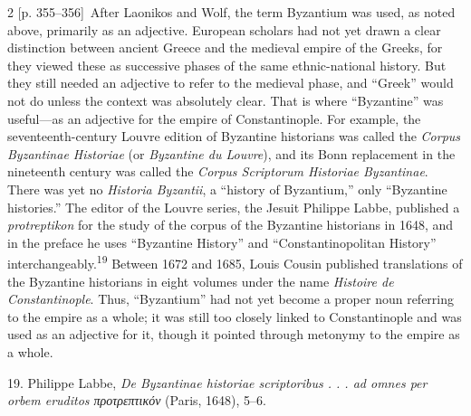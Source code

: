 \documentclass[10pt,a4paper]{article}
\begin{document}
\begin{paracol}{2}
\switchcolumn
{\scriptsize\color{gray}[p. 355–356]}\ After Laonikos and Wolf, the term Byzantium was used, as noted above, primarily as an adjective. European scholars had not yet drawn a clear distinction between ancient Greece and the medieval empire of the Greeks, for they viewed these as successive phases of the same ethnic-national history. But they still needed an adjective to refer to the medieval phase, and “Greek” would not do unless the context was absolutely clear. That is where “Byzantine” was useful—as an adjective for the empire of Constantinople. For example, the seventeenth-century Louvre edition of Byzantine historians was called the \textit{Corpus Byzantinae Historiae} (or \textit{Byzantine du Louvre}), and its Bonn replacement in the nineteenth century was called the \textit{Corpus Scriptorum Historiae Byzantinae}. There was yet no \textit{Historia Byzantii}, a “history of Byzantium,” only “Byzantine histories.” The editor of the Louvre series, the Jesuit Philippe Labbe, published a \textit{protreptikon} for the study of the corpus of the Byzantine historians in 1648, and in the preface he uses “Byzantine History” and “Constantinopolitan History” interchangeably.\nobreak\textsuperscript{19} Between 1672 and 1685, Louis Cousin published translations of the Byzantine historians in eight volumes under the name \textit{Histoire de Constantinople}. Thus, “Byzantium” had not yet become a proper noun referring to the empire as a whole; it was still too closely linked to Constantinople and was used as an adjective for it, though it pointed through metonymy to the empire as a whole.\par{\small 19. Philippe Labbe, \textit{De Byzantinae historiae scriptoribus . . . ad omnes per orbem eruditos προτρεπτικόν }(Paris, 1648), 5–6.\par}
\switchcolumn*

\end{paracol}
\end{document}
